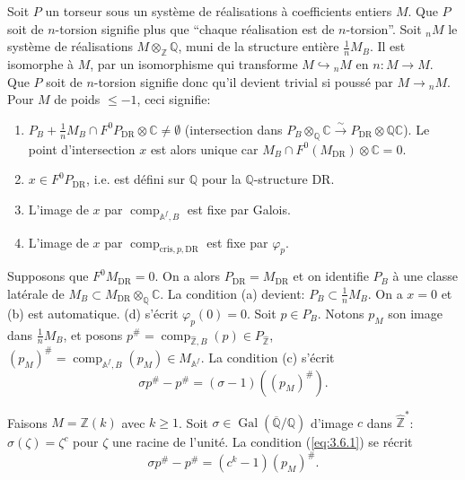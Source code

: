 \documentclass[12pt,a4paper]{article}
\theoremstyle{plain}
\theoremstyle{definition}
\theoremstyle{remark}
\DeclareMathOperator{\Gal}{Gal}
\providecommand{\Gal}{\operatorname{Gal}}
\providecommand{\DR}{\mathrm{DR}}
\providecommand{\cris}{\mathrm{cris}}
\providecommand{\comp}{\operatorname{comp}}
\begin{document}
\begin{paraphrase}[3.6]
Soit $P$ un torseur sous un syst\`eme de r\'ealisations \`a coefficients entiers $M$. Que
$P$ soit de $n$-torsion signifie plus que ``chaque r\'ealisation est de $n$-torsion''. Soit
${}_n M$ le syst\`eme de r\'ealisations $M \otimes_{\mathbb{Z}} \mathbb{Q}$, muni de la
structure enti\`ere $\frac{1}{n} M_B$. Il est isomorphe \`a $M$, par un isomorphisme qui
transforme $M \hookrightarrow {}_n M$ en $n: M \to M$. Que $P$ soit de $n$-torsion
signifie donc qu'il devient trivial si pouss\'e par $M \to {}_n M$. Pour $M$ de poids
$\leq -1$, ceci signifie:
\begin{enumerate}[label=(\alph*)]
\item $P_B + \frac{1}{n} M_B \cap F^0 P_{\DR} \otimes \mathbb{C} \neq \emptyset$
(intersection dans $P_B \otimes_{\mathbb{Q}} \mathbb{C} \xrightarrow{\sim} P_{\DR} \otimes
\mathbb{Q} \mathbb{C}$). Le point d'intersection $x$ est alors unique car $M_B \cap
F^0(M_{\DR}) \otimes \mathbb{C} = 0$.
\item $x \in F^0 P_{\DR}$, i.e. est d\'efini sur $\mathbb{Q}$ pour la
$\mathbb{Q}$-structure $\DR$.
\item L'image de $x$ par $\comp_{\mathbb{A}^f,B}$ est fixe par Galois.
\item L'image de $x$ par $\comp_{\cris,p,\DR}$ est fixe par $\varphi_p$.
\end{enumerate}

Supposons que $F^0 M_{\DR} = 0$. On a alors $P_{\DR} = M_{\DR}$ et on identifie $P_B$
\`a une classe lat\'erale de $M_B \subset M_{\DR} \otimes_{\mathbb{Q}} \mathbb{C}$. La condition
(a) devient: $P_B \subset \frac{1}{n} M_B$. On a $x = 0$ et (b) est automatique. (d)
s'\'ecrit $\varphi_p(0) = 0$. Soit $p \in P_B$. Notons $p_M$ son image dans $\frac{1}{n} M_B$,
et posons $p^\# = \comp_{\hat{\mathbb{Z}},B}(p) \in P_{\hat{\mathbb{Z}}}$,
$(p_M)^\# = \comp_{\mathbb{A}^f,B}(p_M) \in M_{\mathbb{A}^f}$. La condition (c) s'\'ecrit
\begin{equation}\label{eq:3.6.1}
\sigma p^\# - p^\# = (\sigma - 1)((p_M)^\#).
\end{equation}

Faisons $M = \mathbb{Z}(k)$ avec $k \geq 1$. Soit $\sigma \in
\Gal(\overline{\mathbb{Q}}/\mathbb{Q})$ d'image $c$ dans $\hat{\mathbb{Z}}^*$:
$\sigma(\zeta) = \zeta^c$ pour $\zeta$ une racine de l'unit\'e. La condition
(\ref{eq:3.6.1}) se r\'ecrit
\begin{equation}\label{eq:3.6.2}
\sigma p^\# - p^\# = (c^k - 1)(p_M)^\#.
\end{equation}


\end{paraphrase}
\end{document}
